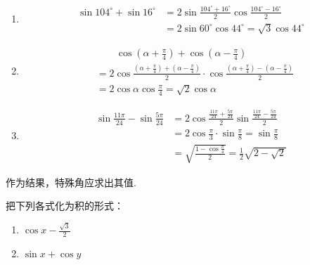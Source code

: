 \begin{solution}
\begin{enumerate}[(1)]
    \item \[\begin{split}
  \sin104^{\circ}+\sin16^{\circ}&=2\sin\frac{104^{\circ}+16^{\circ}}{2}\cos\frac{104^{\circ}-16^{\circ}}{2}\\
  &=2\sin60^{\circ}\cos44^{\circ}=\sqrt{3}\cos44^{\circ}      
    \end{split}\]
    \item \[\begin{split}
        &\qquad \cos\left(\alpha+\frac{\pi}{4}\right)+\cos\left(\alpha-\frac{\pi}{4}\right)\\
        &=2\cos\frac{\left(\alpha+\frac{\pi}{4}\right)+\left(\alpha-\frac{\pi}{4}\right)}{2}\cdot \cos\frac{\left(\alpha+\frac{\pi}{4}\right)-\left(\alpha-\frac{\pi}{4}\right)}{2}\\
       &=2\cos\alpha\cos\frac{\pi}{4}=\sqrt{2}\cos\alpha 
    \end{split}\]
\item \[\begin{split}
    \sin\frac{11\pi}{24}-\sin\frac{5\pi}{24}&=2\cos\frac{\frac{11\pi}{24}+\frac{5\pi}{24}}{2}\sin\frac{\frac{11\pi}{24}-\frac{5\pi}{24}}{2}\\
    &=2\cos\frac{\pi}{3}\cdot \sin\frac{\pi}{8}=\sin\frac{\pi}{8}\\
    &=\sqrt{\frac{1-\cos\frac{\pi}{4}}{2}}=\frac{1}{2}\sqrt{2-\sqrt{2}}
\end{split}\]
    \end{enumerate}
\end{solution}

\begin{remark}
    作为结果，特殊角应求出其值.
\end{remark}

\begin{example}
    把下列各式化为积的形式：
\begin{multicols}{2}
\begin{enumerate}[(1)]
    \item $\cos x-\frac{\sqrt{3}}{2}$
    \item $\sin x+\cos y$
\end{enumerate}
\end{multicols}
\end{example}

